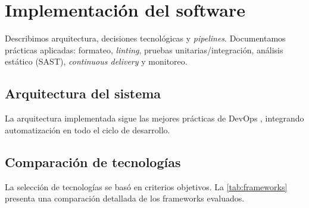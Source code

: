 \section{Implementación del software}
Describimos arquitectura, decisiones tecnológicas y \textit{pipelines}. Documentamos prácticas aplicadas: formateo, \textit{linting}, pruebas unitarias/integración, análisis estático (SAST), \textit{continuous delivery} y monitoreo. 

\subsection{Arquitectura del sistema}
La arquitectura implementada sigue las mejores prácticas de DevOps \cite{forsgren2018accelerate}, integrando automatización en todo el ciclo de desarrollo. %


\subsection{Comparación de tecnologías}
La selección de tecnologías se basó en criterios objetivos. La \cref{tab:frameworks} presenta una comparación detallada de los frameworks evaluados.

